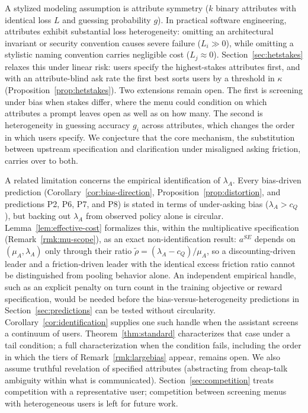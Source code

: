\documentclass[11pt]{article}
\begin{document}
A stylized modeling assumption is attribute symmetry ($k$ binary attributes with identical loss $L$ and guessing probability $g$). In practical software engineering, attributes exhibit substantial loss heterogeneity: omitting an architectural invariant or security convention causes severe failure ($L_i \gg 0$), while omitting a stylistic naming convention carries negligible cost ($L_j \approx 0$). Section~\ref{sec:hetstakes} relaxes this under linear risk: users specify the highest-stakes attributes first, and with an attribute-blind ask rate the first best sorts users by a threshold in $\kappa$ (Proposition~\ref{prop:hetstakes}). Two extensions remain open. The first is screening under bias when stakes differ, where the menu could condition on which attributes a prompt leaves open as well as on how many. The second is heterogeneity in guessing accuracy $g_i$ across attributes, which changes the order in which users specify. We conjecture that the core mechanism, the substitution between upstream specification and clarification under misaligned asking friction, carries over to both.

A related limitation concerns the empirical identification of $\lambda_A$. Every
bias-driven prediction (Corollary~\ref{cor:bias-direction}, Proposition~\ref{prop:distortion}, and
predictions P2, P6, P7, and P8) is stated in terms of under-asking bias ($\lambda_A > c_Q$), but backing out
$\lambda_A$ from observed policy alone is circular. Lemma~\ref{lem:effective-cost}
formalizes this, within the multiplicative specification (Remark~\ref{rmk:mu-scope}), as an exact non-identification result: $a^{SE}$ depends on
$(\mu_A,\lambda_A)$ only through their ratio $\tilde\rho = (\lambda_A - c_Q)/\mu_A$, so a discounting-driven leader and a
friction-driven leader with the identical excess friction ratio cannot be distinguished
from pooling behavior alone. An independent empirical handle, such as an explicit penalty
on turn count in the training objective or reward specification, would be needed before
the bias-versus-heterogeneity predictions in Section~\ref{sec:predictions} can be tested
without circularity. Corollary~\ref{cor:identification} supplies one such handle when the assistant screens a continuum of users. Theorem~\ref{thm:standard} characterizes that case under a tail condition; a full characterization when the condition fails, including the order in which the tiers of Remark~\ref{rmk:largebias} appear, remains open. We also assume truthful revelation of specified attributes (abstracting from cheap-talk ambiguity within what is communicated). Section~\ref{sec:competition} treats competition with a representative user; competition between screening menus with heterogeneous users is left for future work.
\end{document}
